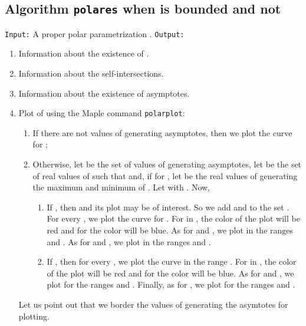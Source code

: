 \documentclass{elsart}
\begin{document}
  \begin{figure}[ht]
\begin{center}
\centerline{  }
\end{center}
\caption{}
\end{figure}



\subsection{Algorithm {\tt polares} when  is bounded and  not}\label{3.2}

{\tt Input:} A proper polar parametrization . \newline
{\tt Output:}
 \begin{enumerate}
  \item Information about the existence of .
  \item Information about the self-intersections.
  \item Information about the existence of asymptotes.
  \item \label{plot}Plot of  using the Maple command \texttt{polarplot}:
  \begin{enumerate}
  \item If there are not values of  generating asymptotes, then we plot the curve for ;

  \item Otherwise, let  be the set of values of  generating asymptotes, let  be the set of real values of  such that  and, if  for , let  be the real values of  generating the maximum and minimum of .
\newline
Let   with .
  \newline
Now,

\begin{enumerate}
  \item If , then  and its plot may be of interest. So we add
  and  to the set . 
 \newline 
For every , we plot the curve   for   . For   in  , the color of the plot will be red and for  the color will be blue. 
  \newline
As for  and  , we plot  in the ranges  and  .
  \newline
  As for  and  , we plot  in the ranges  and  .


\item  If , then for every , we plot the curve  in the range  . For  in  , the color of the plot will be red and for  the color will be blue.
\newline
As for  and  , we plot   for the ranges  and  .
\newline
Finally, as for , we plot   for the ranges   and  .



\end{enumerate}





\end{enumerate}
Let us point out that we border the values of  generating the asymtotes for plotting.

\end{enumerate}
\end{document}
